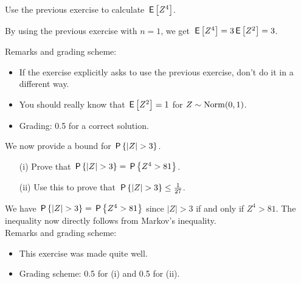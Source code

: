 \begin{exercise}[0.5]
Use the previous exercise to calculate $\E{Z^4}$. \\
\begin{solution}
By using the previous exercise with $n=1$, we get $\E{Z^4} = 3\E{Z^2} = 3$. 
\end{solution}

\noindent Remarks and grading scheme:
\begin{itemize}
\item If the exercise explicitly asks to use the previous exercise, don't do it in a different way. 
\item You should really know that $\E{Z^2} = 1$ for $Z \sim \Norm{0,1}$. 
\item Grading: 0.5 for a correct solution.
\end{itemize}
\end{exercise}


\begin{exercise}[1]
We now provide a bound for $\P{|Z| > 3}$.
\begin{enumerate}
\item[(i)] Prove that  $\P{|Z| > 3} = \P{Z^4 > 81}$.
\item[(ii)] Use this to prove that $\P{|Z| > 3} \leq \frac1{27}$.
\end{enumerate} 
\begin{solution}
We have $\P{|Z| > 3} = \P{Z^4 > 81}$ since $|Z| >3$ if and only if $Z^4 > 81$. The inequality now directly follows from Markov's inequality. \\

\noindent Remarks and grading scheme:
\begin{itemize}
\item This exercise was made quite well.
\item Grading scheme: 0.5 for (i) and 0.5 for (ii).
\end{itemize}
\end{solution}
\end{exercise}


